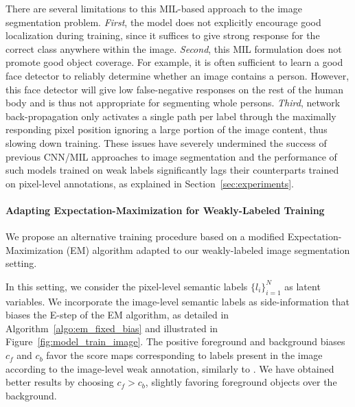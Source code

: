 There are several limitations to this MIL-based approach to the image
segmentation problem. \emph{First}, the model does not explicitly
encourage good localization during training, since it suffices to give
strong response for the correct class anywhere within the
image. \emph{Second}, this MIL formulation does not promote good
object coverage. For example, it is often sufficient to learn a good
face detector to reliably determine whether an image contains a
person. However, this face detector will give low false-negative
responses on the rest of the human body and is thus not appropriate
for segmenting whole persons. \emph{Third}, network back-propagation
only activates a single path per label through the maximally
responding pixel position ignoring a large portion of the image
content, thus slowing down training. These issues have severely
undermined the success of previous CNN/MIL approaches to image
segmentation and the performance of such models trained on weak labels
significantly lags their counterparts trained on pixel-level
annotations, as explained in Section~\ref{sec:experiments}.

\paragraph{Adapting Expectation-Maximization for Weakly-Labeled Training}

We propose an alternative training procedure based on a modified
Expectation-Maximization (EM) algorithm adapted to our weakly-labeled
image segmentation setting.

In this setting, we consider the pixel-level semantic labels
$\{l_i\}_{i=1}^N$ as latent variables. We incorporate the image-level
semantic labels as side-information that biases the E-step of the EM
algorithm, as detailed in Algorithm~\ref{algo:em_fixed_bias} and
illustrated in Figure~\ref{fig:model_train_image}. The positive
foreground and background biases $c_f$ and $c_b$ favor the score maps
corresponding to labels present in the image according to the
image-level weak annotation, similarly to \cite{Lu2013sports}. We have
obtained better results by choosing $c_f > c_b$, slightly favoring
foreground objects over the background.


